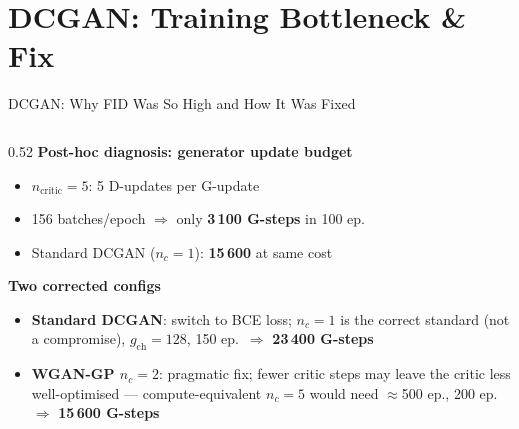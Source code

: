 \documentclass[aspectratio=169,10pt]{beamer}
\begin{document}
%
\section{DCGAN: Training Bottleneck \& Fix}
%
\begin{frame}[shrink=10]{DCGAN: Why FID Was So High and How It Was Fixed}
\small
  \begin{columns}[T]
    \begin{column}{0.52\textwidth}
      \textbf{Post-hoc diagnosis: generator update budget}
      \begin{itemize}
        \item $n_\text{critic}=5$: 5 D-updates per G-update
        \item 156 batches/epoch $\Rightarrow$ only \textbf{3\,100 G-steps} in 100 ep.
        \item Standard DCGAN ($n_c=1$): \textbf{15\,600} at same cost
      \end{itemize}

      \vspace{4pt}
      \textbf{Two corrected configs}
      \begin{itemize}
        \item \textbf{Standard DCGAN}: switch to BCE loss; $n_c=1$ is the
              correct standard (not a compromise), $g_\text{ch}=128$,
              150 ep.\ $\Rightarrow$ \textbf{23\,400 G-steps}
        \item \textbf{WGAN-GP $n_c=2$}: pragmatic fix; fewer critic steps
              may leave the critic less well-optimised ---
              compute-equivalent $n_c{=}5$ would need $\approx$500 ep., 200 ep.\ $\Rightarrow$ \textbf{15\,600 G-steps}
      \end{itemize}


\end{column}
\end{columns}
\end{frame}
\end{document}
